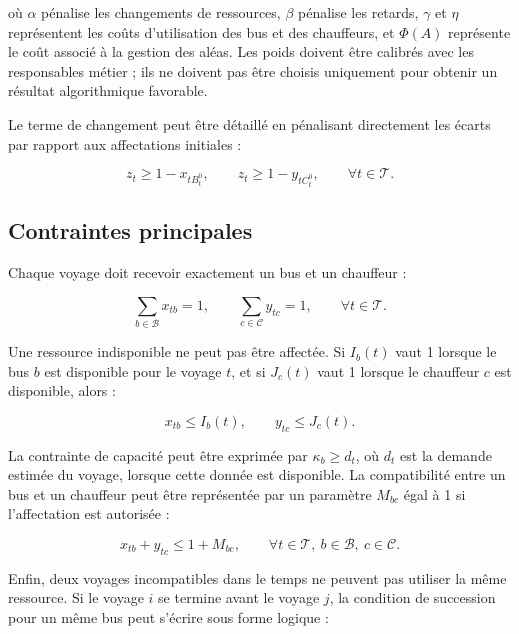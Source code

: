 \documentclass[12pt,a4paper]{article}
\newcommand{\Voy}{\mathcal{T}}
\newcommand{\Bus}{\mathcal{B}}
\newcommand{\Chauf}{\mathcal{C}}
\begin{document}
où \(\alpha\) pénalise les changements de ressources, \(\beta\) pénalise les retards, \(\gamma\) et \(\eta\) représentent les coûts d’utilisation des bus et des chauffeurs, et \(\Phi(A)\) représente le coût associé à la gestion des aléas. Les poids doivent être calibrés avec les responsables métier ; ils ne doivent pas être choisis uniquement pour obtenir un résultat algorithmique favorable.

Le terme de changement peut être détaillé en pénalisant directement les écarts par rapport aux affectations initiales :

\begin{equation}
z_t \geq 1-x_{tB_t^0},\qquad
z_t \geq 1-y_{tC_t^0},\qquad \forall t\in\Voy.
\end{equation}

\subsection{Contraintes principales}

Chaque voyage doit recevoir exactement un bus et un chauffeur :

\begin{equation}
\sum_{b\in\Bus}x_{tb}=1,\qquad
\sum_{c\in\Chauf}y_{tc}=1,
\qquad \forall t\in\Voy.
\end{equation}

Une ressource indisponible ne peut pas être affectée. Si \(I_b(t)\) vaut 1 lorsque le bus \(b\) est disponible pour le voyage \(t\), et si \(J_c(t)\) vaut 1 lorsque le chauffeur \(c\) est disponible, alors :

\begin{equation}
x_{tb}\leq I_b(t),\qquad y_{tc}\leq J_c(t).
\end{equation}

La contrainte de capacité peut être exprimée par \(\kappa_b\geq d_t\), où \(d_t\) est la demande estimée du voyage, lorsque cette donnée est disponible. La compatibilité entre un bus et un chauffeur peut être représentée par un paramètre \(M_{bc}\) égal à 1 si l’affectation est autorisée :

\begin{equation}
x_{tb}+y_{tc}\leq 1+M_{bc},
\qquad \forall t\in\Voy,\ b\in\Bus,\ c\in\Chauf.
\end{equation}

Enfin, deux voyages incompatibles dans le temps ne peuvent pas utiliser la même ressource. Si le voyage \(i\) se termine avant le voyage \(j\), la condition de succession pour un même bus peut s’écrire sous forme logique :
\end{document}
